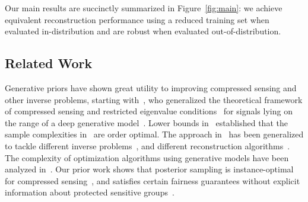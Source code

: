 Our main results are succinctly summarized in Figure~\ref{fig:main}:
we achieve equivalent reconstruction performance using a reduced
training set when evaluated in-distribution and are robust when
evaluated out-of-distribution.

\subsection{Related Work} 

Generative priors have shown great utility to improving compressed
sensing and other inverse problems, starting
with~\cite{bora2017compressed}, who generalized the theoretical
framework of compressed sensing and restricted eigenvalue
conditions~\cite{tibshirani1996regression,
donoho2006compressed,bickel2009simultaneous, candes2008restricted,
hegde2008random, baraniuk2009random, baraniuk2010model,
eldar2009robust} for signals lying on the range of a deep generative
model~\cite{goodfellow2014generative, kingma2013auto,
song2021scorebased}.  Lower bounds in~\cite{kamath2019lower,
liu2019information, jalali2019solving} established that the sample
complexities in~\cite{bora2017compressed} are order optimal.  The
approach in~\cite{bora2017compressed} has been generalized to tackle
different inverse problems~\cite{jalal2020robust, hand2018phase,
    asim2018solving, qiu2019robust, liu2020sample, mardani2017deep,
    rick2017one, balevi2020high}, and different reconstruction
    algorithms~\cite{dhar2018modeling, kabkab2018task,
    pandit2019inference, fletcher2018inference, fletcher2018plug,
mardani2018deep, heckel2018deep, heckel2020compressive,
daras2021intermediate}.  The complexity of optimization algorithms
using generative models have been analyzed in~\cite{gomez2019fast,
hegde2018algorithmic, lei2019inverting, hand2017global}.  Our prior
work shows that posterior sampling is instance-optimal for compressed
sensing~\cite{jalal2021instance}, and satisfies certain fairness
guarantees without explicit information about protected sensitive
groups~\cite{jalal2021fairness}.

